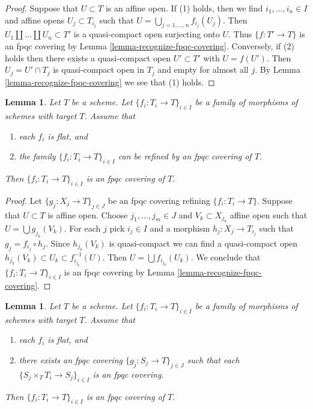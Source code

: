 \documentclass{stacks-project}
\theoremstyle{plain}
\newtheorem{lemma}[subsection]{Lemma}
\theoremstyle{definition}
\theoremstyle{remark}
\numberwithin{equation}{subsection}
\begin{document}
\begin{proof}
Suppose that $U \subset T$ is an affine open. If (1) holds, then we find
$i_1, \ldots, i_n \in I$ and affine opens $U_j \subset T_{i_j}$ such that
$U = \bigcup_{j = 1, \ldots, n} f_{i_j}(U_j)$. Then
$U_1 \amalg \ldots \amalg U_n \subset T'$ is a quasi-compact open surjecting
onto $U$. Thus $\{f : T' \to T\}$ is an fpqc covering by
Lemma \ref{lemma-recognize-fpqc-covering}.
Conversely, if (2) holds then there exists a quasi-compact open
$U' \subset T'$ with $U = f(U')$. Then $U_j = U' \cap T_j$ is quasi-compact
open in $T_j$ and empty for almost all $j$. By
Lemma \ref{lemma-recognize-fpqc-covering} we see that (1) holds.
\end{proof}

\begin{lemma}
\label{lemma-family-flat-dominated-covering}
Let $T$ be a scheme. Let $\{f_i : T_i \to T\}_{i \in I}$ be a family of
morphisms of schemes with target $T$. Assume that
\begin{enumerate}
\item each $f_i$ is flat, and
\item the family $\{f_i : T_i \to T\}_{i \in I}$ can be refined by an
fpqc covering of $T$.
\end{enumerate}
Then $\{f_i : T_i \to T\}_{i \in I}$ is an fpqc covering of $T$.
\end{lemma}

\begin{proof}
Let $\{g_j : X_j \to T\}_{j \in J}$ be an fpqc covering refining
$\{f_i : T_i \to T\}$. Suppose that $U \subset T$ is affine open.
Choose $j_1, \ldots, j_m \in J$ and $V_k \subset X_{j_k}$ affine
open such that $U = \bigcup g_{j_k}(V_k)$. For each $j$ pick $i_j \in I$
and a morphism $h_j : X_j \to T_{i_j}$ such that $g_j = f_{i_j} \circ h_j$.
Since $h_{j_k}(V_k)$ is quasi-compact we can find a quasi-compact
open $h_{j_k}(V_k) \subset U_k \subset f_{i_{j_k}}^{-1}(U)$.
Then $U = \bigcup f_{i_{j_k}}(U_k)$. We conclude that
$\{f_i : T_i \to T\}_{i \in I}$ is an fpqc covering by
Lemma \ref{lemma-recognize-fpqc-covering}.
\end{proof}

\begin{lemma}
\label{lemma-family-flat-fpqc-local-covering}
Let $T$ be a scheme. Let $\{f_i : T_i \to T\}_{i \in I}$ be a family of
morphisms of schemes with target $T$. Assume that
\begin{enumerate}
\item each $f_i$ is flat, and
\item there exists an fpqc covering
$\{g_j : S_j \to T\}_{j \in J}$ such that each
$\{S_j \times_T T_i \to S_j\}_{i \in I}$ is an fpqc covering.
\end{enumerate}
Then $\{f_i : T_i \to T\}_{i \in I}$ is an fpqc covering of $T$.
\end{lemma}
\end{document}
